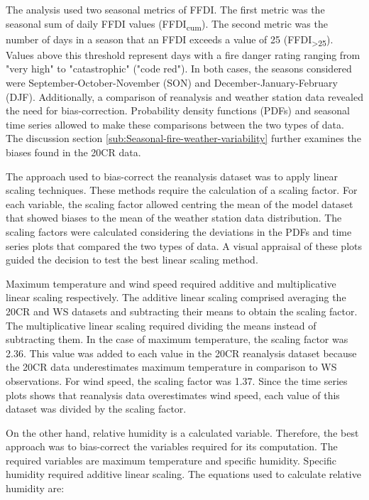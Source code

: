 The analysis used two seasonal metrics of FFDI. The first metric was
the seasonal sum of daily FFDI values (FFDI\textsubscript{cum}).
The second metric was the number of days in a season that an FFDI
exceeds a value of 25 (FFDI\textsubscript{>25}). Values above this threshold represent
days with a fire danger rating ranging from "very high" to "catastrophic" ("code red").
In both cases, the seasons considered were September-October-November (SON) and December-January-February
(DJF). Additionally, a comparison of reanalysis and weather station
data revealed the need for bias-correction. Probability density functions
(PDFs) and seasonal time series allowed to make these comparisons
between the two types of data. The discussion section \ref{sub:Seasonal-fire-weather-variability}
further examines the biases found in the 20CR data. 

The approach used to bias-correct the reanalysis dataset was to apply
linear scaling techniques. These methods require the calculation of a scaling factor. 
For each variable, the scaling factor allowed centring the mean of the model dataset that showed biases to the mean of the weather station data distribution. 
The scaling factors were calculated considering the deviations in the PDFs and time series plots that compared the two types of data. 
A visual appraisal of these plots guided the decision to test the best linear scaling method.    
  
Maximum temperature and wind speed required additive and multiplicative linear scaling respectively. 
The additive linear scaling comprised averaging the 20CR and WS datasets and subtracting their means to obtain the scaling factor. 
The multiplicative linear scaling required dividing the means instead of subtracting them. 
In the case of maximum temperature, the scaling factor was 2.36. This value was added to each value in the
20CR reanalysis dataset because the 20CR data underestimates maximum temperature in comparison to WS observations. 
For wind speed, the scaling factor was 1.37. Since the time series plots shows that reanalysis data overestimates wind speed, each value of this dataset was
divided by the scaling factor.               
 
On the other hand, relative humidity is a calculated variable. Therefore, the best
approach was to bias-correct the variables required for its computation.
The required variables are maximum temperature and specific humidity.
Specific humidity required additive linear scaling. The equations
used to calculate relative humidity are: 

